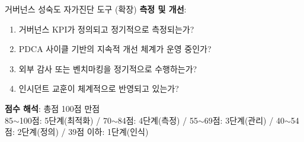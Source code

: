 \begin{practicaltool}{거버넌스 성숙도 자가진단 도구 (확장)}
\textbf{측정 및 개선}:
\begin{enumerate}
 \item 거버넌스 KPI가 정의되고 정기적으로 측정되는가?
 \item PDCA 사이클 기반의 지속적 개선 체계가 운영 중인가?
 \item 외부 감사 또는 벤치마킹을 정기적으로 수행하는가?
 \item 인시던트 교훈이 체계적으로 반영되고 있는가?
\end{enumerate}

\textbf{점수 해석}: 총점 100점 만점\\
85$\sim$100점: 5단계(최적화) / 70$\sim$84점: 4단계(측정) / 55$\sim$69점: 3단계(관리) / 40$\sim$54점: 2단계(정의) / 39점 이하: 1단계(인식)
\end{practicaltool}

